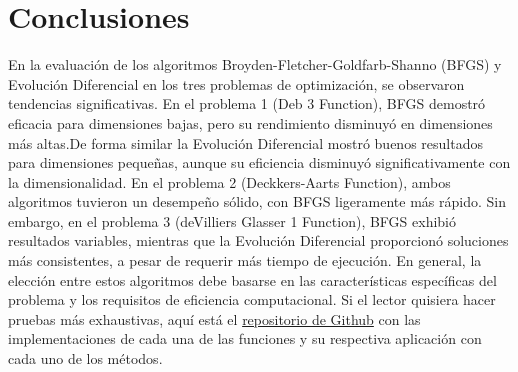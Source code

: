 \documentclass{article}
\begin{document}
\section{Conclusiones}


En la evaluación de los algoritmos Broyden-Fletcher-Goldfarb-Shanno (BFGS) y 
Evolución Diferencial en los tres problemas de optimización, se observaron 
tendencias significativas. En el problema 1 (Deb 3 Function), BFGS demostró 
eficacia para dimensiones bajas, pero su rendimiento disminuyó en dimensiones 
más altas.De forma similar la Evolución Diferencial mostró buenos resultados 
para dimensiones pequeñas, aunque su eficiencia disminuyó significativamente con la 
dimensionalidad. En el problema 2 (Deckkers-Aarts Function), ambos algoritmos 
tuvieron un desempeño sólido, con BFGS ligeramente más rápido. Sin embargo, 
en el problema 3 (deVilliers Glasser 1 Function), BFGS exhibió resultados 
variables, mientras que la Evolución Diferencial proporcionó soluciones más 
consistentes, a pesar de requerir más tiempo de ejecución. En general, la 
elección entre estos algoritmos debe basarse en las características 
específicas del problema y los requisitos de eficiencia computacional. Si el 
lector quisiera hacer pruebas más exhaustivas, aquí está el 
\href{https://github.com/alexsierra45/optimization-project}{repositorio de Github}
con las implementaciones de cada una de las funciones y su respectiva 
aplicación con cada uno de los métodos.
\end{document}
